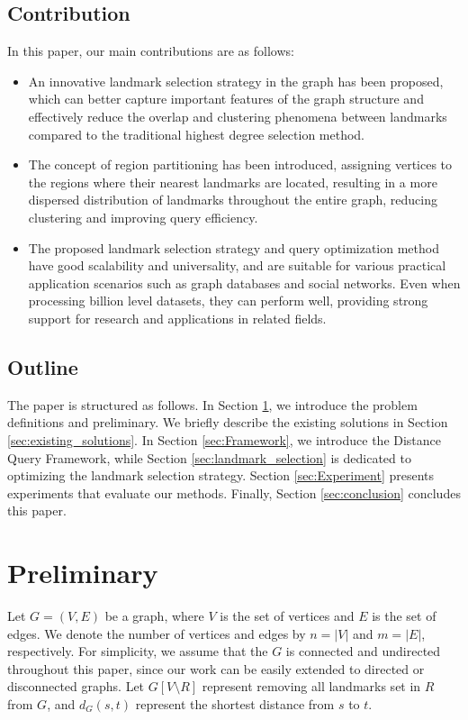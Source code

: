 \documentclass[sigconf]{acmart}
\begin{document}
\subsection{Contribution}
In this paper, our main contributions are as follows: \par
\begin{itemize}
\item An innovative landmark selection strategy in the graph has been proposed, which can better capture important features of the graph structure and effectively reduce the overlap and clustering phenomena between landmarks compared to the traditional highest degree selection method.\par
\item The concept of region partitioning has been introduced, assigning vertices to the regions where their nearest landmarks are located, resulting in a more dispersed distribution of landmarks throughout the entire graph, reducing clustering and improving query efficiency.\par
\item The proposed landmark selection strategy and query optimization method have good scalability and universality, and are suitable for various practical application scenarios such as graph databases and social networks. Even when processing billion level datasets, they can perform well, providing strong support for research and applications in related fields.\par
\end{itemize}
%
%
\subsection{Outline}

The paper is structured as follows. In Section \ref{sec:Preliminary}, we introduce the problem definitions and preliminary. We briefly describe the existing solutions in Section \ref{sec:existing_solutions}. In Section \ref{sec:Framework}, we introduce the Distance Query Framework, while Section \ref{sec:landmark_selection} is dedicated to optimizing the landmark selection strategy. Section \ref{sec:Experiment} presents experiments that evaluate our methods. Finally, Section \ref{sec:conclusion} concludes this paper.\par
%
%
\section{Preliminary}
\label{sec:Preliminary}
Let $G=(V,E)$ be a graph, where $V$ is the set of vertices and $E$ is the set of edges. We denote the number of vertices and edges by $n = |V|$ and $m = |E|$, respectively. For simplicity, we assume that the $G$ is connected and undirected throughout this paper, since our work can be easily extended to directed or disconnected graphs. Let $G[V\setminus R]$ represent removing all landmarks set in $R$ from $G$, and $d_{G}(s,t)$ represent the shortest distance from $s$ to $t$.\par
\end{document}
